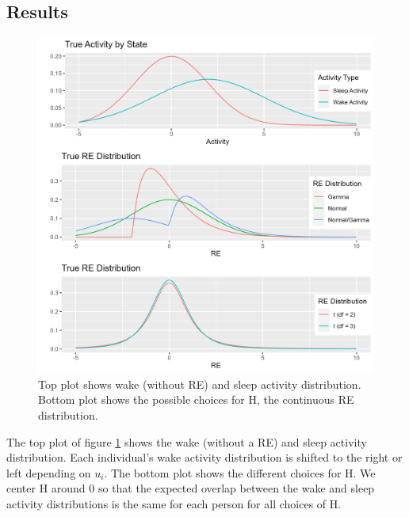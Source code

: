 \documentclass{article}
\begin{document}
\subsection{Results}\label{SimStudyResults}

\begin{figure}
\includegraphics[scale=.5]{Support/REdist.png}
\centering
\caption{Top plot shows wake (without RE) and sleep activity distribution. Bottom plot shows the possible choices for H, the continuous RE distribution.}
\label{REdist}
\end{figure}

The top plot of figure \ref{REdist} shows the wake (without a RE) and sleep activity distribution. Each individual's wake activity distribution is shifted to the right or left depending on $u_i$. The bottom plot shows the different choices for H. We center H around 0 so that the expected overlap between the wake and sleep activity distributions is the same for each person for all choices of H. 
\end{document}
